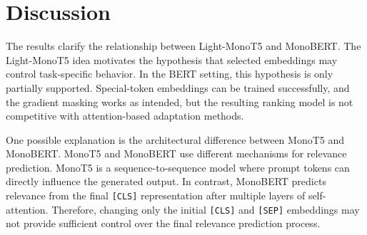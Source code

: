 \begin{table}[ht]
\centering
\small
{}
\caption{Number of updated parameters for each approach. The table highlights the efficiency-effectiveness trade-off between highly restricted embedding-level methods, attention-level methods, LoRA variants, and full fine-tuning.}
\label{tab:updated_parameters}
\end{table}

\section{Discussion}
\label{sec:results_interpretation}

The results clarify the relationship between Light-MonoT5 and MonoBERT. The Light-MonoT5 idea motivates the hypothesis that selected embeddings may control task-specific behavior. In the BERT setting, this hypothesis is only partially supported. Special-token embeddings can be trained successfully, and the gradient masking works as intended, but the resulting ranking model is not competitive with attention-based adaptation methods.

One possible explanation is the architectural difference between MonoT5 and MonoBERT. MonoT5 and MonoBERT use different mechanisms for relevance prediction. MonoT5 is a sequence-to-sequence model where prompt tokens can directly influence the generated output. In contrast, MonoBERT predicts relevance from the final \texttt{[CLS]} representation after multiple layers of self-attention. Therefore, changing only the initial \texttt{[CLS]} and \texttt{[SEP]} embeddings may not provide sufficient control over the final relevance prediction process.

